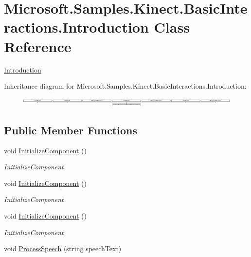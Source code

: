 \hypertarget{class_microsoft_1_1_samples_1_1_kinect_1_1_basic_interactions_1_1_introduction}{\section{Microsoft.\-Samples.\-Kinect.\-Basic\-Interactions.\-Introduction Class Reference}
\label{class_microsoft_1_1_samples_1_1_kinect_1_1_basic_interactions_1_1_introduction}
}


\hyperlink{class_microsoft_1_1_samples_1_1_kinect_1_1_basic_interactions_1_1_introduction}{Introduction}  


Inheritance diagram for Microsoft.\-Samples.\-Kinect.\-Basic\-Interactions.\-Introduction\-:\begin{figure}[H]
\begin{center}
\leavevmode
\includegraphics[height=0.480480cm]{class_microsoft_1_1_samples_1_1_kinect_1_1_basic_interactions_1_1_introduction}
\end{center}
\end{figure}
\subsection*{Public Member Functions}
\begin{DoxyCompactItemize}
\item 
void \hyperlink{class_microsoft_1_1_samples_1_1_kinect_1_1_basic_interactions_1_1_introduction_acc17a70b5b2f55996d4f65b36826c3aa}{Initialize\-Component} ()
\begin{DoxyCompactList}\small\item\em Initialize\-Component \end{DoxyCompactList}\item 
void \hyperlink{class_microsoft_1_1_samples_1_1_kinect_1_1_basic_interactions_1_1_introduction_acc17a70b5b2f55996d4f65b36826c3aa}{Initialize\-Component} ()
\begin{DoxyCompactList}\small\item\em Initialize\-Component \end{DoxyCompactList}\item 
void \hyperlink{class_microsoft_1_1_samples_1_1_kinect_1_1_basic_interactions_1_1_introduction_acc17a70b5b2f55996d4f65b36826c3aa}{Initialize\-Component} ()
\begin{DoxyCompactList}\small\item\em Initialize\-Component \end{DoxyCompactList}\item 
void \hyperlink{class_microsoft_1_1_samples_1_1_kinect_1_1_basic_interactions_1_1_introduction_ae4f1794d8070e64c5afb1e8fc7607ddb}{Process\-Speech} (string speech\-Text)
\end{DoxyCompactItemize}
